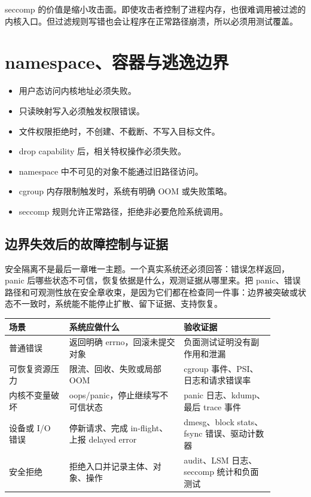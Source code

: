 seccomp 的价值是缩小攻击面。即使攻击者控制了进程内存，也很难调用被过滤的内核入口。但过滤规则写错也会让程序在正常路径崩溃，所以必须用测试覆盖。

\section{namespace、容器与逃逸边界}

\begin{itemize}
\tightlist
\item 用户态访问内核地址必须失败。
\item 只读映射写入必须触发权限错误。
\item 文件权限拒绝时，不创建、不截断、不写入目标文件。
\item drop capability 后，相关特权操作必须失败。
\item namespace 中不可见的对象不能通过旧路径访问。
\item cgroup 内存限制触发时，系统有明确 OOM 或失败策略。
\item seccomp 规则允许正常路径，拒绝非必要危险系统调用。
\end{itemize}

\subsection{边界失效后的故障控制与证据}

安全隔离不是最后一章唯一主题。一个真实系统还必须回答：错误怎样返回，panic 后哪些状态不可信，恢复依据是什么，观测证据从哪里来。把 panic、错误路径和可观测性放在安全章收束，是因为它们都在检查同一件事：边界被突破或状态不一致时，系统能不能停止扩散、留下证据、支持恢复。

\begin{longtable}{p{0.20\linewidth}p{0.38\linewidth}p{0.30\linewidth}}
\toprule
场景 & 系统应做什么 & 验收证据 \\
\midrule
普通错误 & 返回明确 errno，回滚未提交对象 & 负面测试证明没有副作用和泄漏 \\
可恢复资源压力 & 限流、回收、失败或局部 OOM & cgroup 事件、PSI、日志和请求错误率 \\
内核不变量破坏 & oops/panic，停止继续写不可信状态 & panic 日志、kdump、最后 trace 事件 \\
设备或 I/O 错误 & 停新请求、完成 in-flight、上报 delayed error & dmesg、block stats、fsync 错误、驱动计数器 \\
安全拒绝 & 拒绝入口并记录主体、对象、操作 & audit、LSM 日志、seccomp 统计和负面测试 \\
\bottomrule
\end{longtable}

